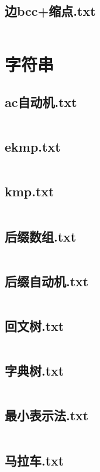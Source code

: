 \documentclass[a4paper,11pt]{article}
\begin{document}
\subsection{边bcc+缩点.txt}
\inputminted{c++}{"D:/tmplz/templates/图论/边bcc+缩点.txt"}
\section{字符串}
\subsection{ac自动机.txt}
\inputminted{c++}{"D:/tmplz/templates/字符串/ac自动机.txt"}
\subsection{ekmp.txt}
\inputminted{c++}{"D:/tmplz/templates/字符串/ekmp.txt"}
\subsection{kmp.txt}
\inputminted{c++}{"D:/tmplz/templates/字符串/kmp.txt"}
\subsection{后缀数组.txt}
\inputminted{c++}{"D:/tmplz/templates/字符串/后缀数组.txt"}
\subsection{后缀自动机.txt}
\inputminted{c++}{"D:/tmplz/templates/字符串/后缀自动机.txt"}
\subsection{回文树.txt}
\inputminted{c++}{"D:/tmplz/templates/字符串/回文树.txt"}
\subsection{字典树.txt}
\inputminted{c++}{"D:/tmplz/templates/字符串/字典树.txt"}
\subsection{最小表示法.txt}
\inputminted{c++}{"D:/tmplz/templates/字符串/最小表示法.txt"}
\subsection{马拉车.txt}
\inputminted{c++}{"D:/tmplz/templates/字符串/马拉车.txt"}
\end{document}
